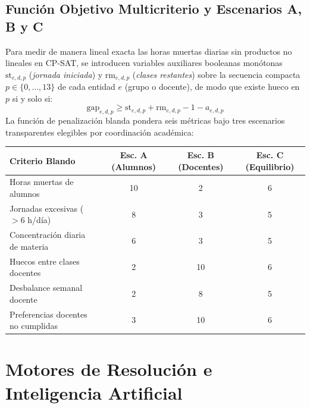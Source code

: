 \documentclass[11pt,letterpaper]{article}
\newcommand{\seccionUPV}[1]{%
    \section{\texorpdfstring{\textcolor{upvmorado}{#1}}{#1}}%
    \vspace{-0.22cm}{\color{upvnaranja}\rule{\textwidth}{1.1pt}}\vspace{0.12cm}%
}
\newcommand{\subseccionUPV}[1]{%
    \subsection{\texorpdfstring{\textcolor{upvazul}{#1}}{#1}}%
}
\begin{document}
\subseccionUPV{Función Objetivo Multicriterio y Escenarios A, B y C}
Para medir de manera lineal exacta las horas muertas diarias sin productos no lineales en CP-SAT, se introducen variables auxiliares booleanas monótonas $\text{st}_{e,d,p}$ (\textit{jornada iniciada}) y $\text{rm}_{e,d,p}$ (\textit{clases restantes}) sobre la secuencia compacta $p \in \{0,\dots,13\}$ de cada entidad $e$ (grupo o docente), de modo que existe hueco en $p$ si y solo si:
\[
\text{gap}_{e,d,p} \geq \text{st}_{e,d,p} + \text{rm}_{e,d,p} - 1 - a_{e,d,p}
\]
La función de penalización blanda pondera seis métricas bajo tres escenarios transparentes elegibles por coordinación académica:
\begin{center}
\small
\begin{tabular}{@{}lccc@{}}
\toprule
\textbf{Criterio Blando} & \textbf{Esc. A (Alumnos)} & \textbf{Esc. B (Docentes)} & \textbf{Esc. C (Equilibrio)} \\
\midrule
Horas muertas de alumnos & 10 & 2 & 6 \\
Jornadas excesivas ($>6$ h/día) & 8 & 3 & 5 \\
Concentración diaria de materia & 6 & 3 & 5 \\
Huecos entre clases docentes & 2 & 10 & 6 \\
Desbalance semanal docente & 2 & 8 & 5 \\
Preferencias docentes no cumplidas & 3 & 10 & 6 \\
\bottomrule
\end{tabular}
\end{center}

\seccionUPV{Motores de Resolución e Inteligencia Artificial}
\end{document}

